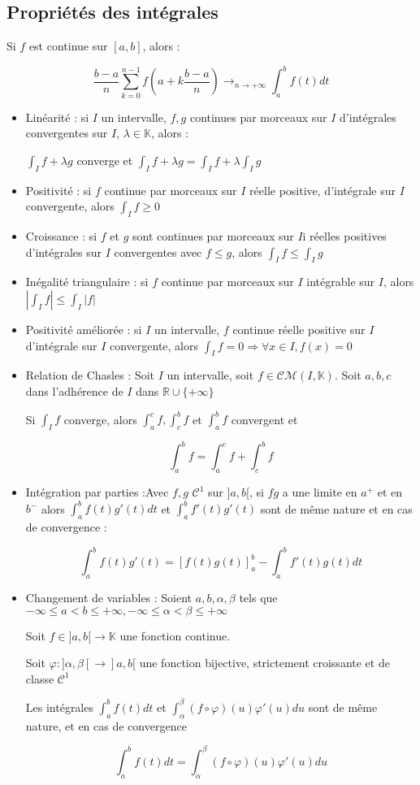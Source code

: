 \documentclass[a4paper,12pt]{book}
\newcommand{\Thr}[2]{\begin{tcolorbox}[sharp corners, colback=white,colframe=red!10!blue!30!green!75!, title=Théorème : #1]#2\end{tcolorbox}}
\def\R{\mathbb{R}}
\def\K{\mathbb{K}}
\begin{document}
\subsection{Propriétés des intégrales}
\Thr{Sommes de Riemann}{Si $f$ est continue sur $[a,b]$, alors :
\par $$\frac{b-a}{n}\sum\limits_{k=0}^{n-1}f\left(a + k\frac{b-a}{n}\right)\to_{n\to+\infty}\int_a^bf(t)dt$$}
\Thr{Propriétés des intégrales impropres}{\begin{itemize}
\item Linéarité : si $I$ un intervalle, $f,g$ continues par morceaux sur $I$ d'intégrales convergentes sur $I$, $\lambda\in\K$, alors : \par \begin{center}$\int_If + \lambda g$ converge et $\int_If+\lambda g = \int_I f+\lambda\int_Ig$ \end{center}
\item Positivité : si $f$ continue par morceaux sur $I$ réelle positive, d'intégrale sur $I$ convergente, alors $\int_If\geq 0$
\item Croissance : si $f$ et $g$ sont continues par morceaux sur $I$i réelles positives d'intégrales sur $I$ convergentes avec $f\leq g$, alors $\int_If\leq \int_Ig$
\item Inégalité triangulaire : si $f$ continue par morceaux sur $I$ intégrable sur $I$, alors $\left\vert\int_If\right\vert \leq\int_I\vert f\vert$ 
\item Positivité améliorée : si $I$ un intervalle, $f$ continue réelle positive sur $I$ d'intégrale sur $I$ convergente, alors $\int_If = 0 \Rightarrow \forall x\in I, f(x)=0$
\item Relation de Chasles : Soit $I$ un intervalle, soit $f\in\mathcal{CM}(I,\K)$. Soit $a,b,c$ dans l'adhérence de $I$ dans $\R\cup\{+\infty\}$
\par Si $\int_If$ converge, alors $\int_a^cf, \int_c^bf$ et $\int_a^bf$ convergent et
\par $$\int_a^bf=\int_a^cf+\int_c^bf$$
\item Intégration par parties :Avec $f,g$ $\mathcal{C}^1$ sur $]a,b[$,  si $fg$ a une limite en $a^+$ et en $b^-$ alors $\int_a^bf(t)g'(t)dt$ et $\int_a^bf'(t)g'(t)$ sont de même nature et en cas de convergence :
\par $$\int_a^bf(t)g'(t) = [f(t)g(t)]_a^b -\int_a^bf'(t)g(t)dt$$
\item Changement de variables : Soient $a,b,\alpha, \beta$ tels que $-\infty\leq a<b\leq +\infty, -\infty\leq\alpha<\beta\leq+\infty$
\par Soit $f\in]a,b[\to \K$ une fonction continue.
\par Soit $\varphi:]\alpha,\beta[\to]a,b[$ une fonction bijective, strictement croissante et de classe $\mathcal{C}^1$
\par Les intégrales $\int_a^bf(t)dt$ et $\int_\alpha^\beta(f\circ\varphi)(u)\varphi'(u)du$ sont de même nature, et en cas de convergence
\par $$\int_a^bf(t)dt=\int_\alpha^\beta(f\circ\varphi)(u)\varphi'(u)du$$
\end{itemize}}
\end{document}
